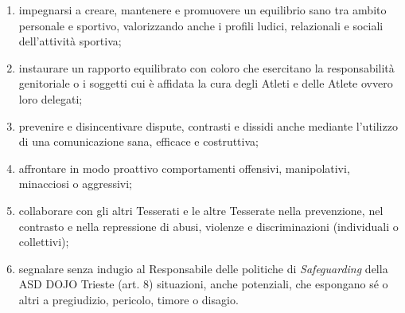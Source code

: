 \documentclass{djtsasddoc}
\begin{document}
\begin{enumerate}
\begin{enumerate}
			\item impegnarsi a creare, mantenere e promuovere un equilibrio sano tra ambito personale e 	sportivo, valorizzando anche i profili ludici, relazionali e sociali dell'attività sportiva;
			\item instaurare un rapporto equilibrato con coloro che esercitano la responsabilità genitoriale o i	soggetti cui è affidata la cura degli Atleti e delle Atlete ovvero loro delegati;
			\item prevenire e disincentivare dispute, contrasti e dissidi anche mediante l'utilizzo di una	comunicazione sana, efficace e costruttiva;
			\item affrontare in modo proattivo comportamenti offensivi, manipolativi, minacciosi o aggressivi;
			\item collaborare con gli altri Tesserati e le altre Tesserate nella prevenzione, nel contrasto e nella	repressione di abusi, violenze e discriminazioni (individuali o collettivi);
			\item segnalare senza indugio al Responsabile delle politiche di \textit{Safeguarding} della ASD DOJO Trieste (art. 8) situazioni, anche potenziali, che espongano sé o altri a pregiudizio, pericolo, timore o disagio.
		\end{enumerate}
	\end{enumerate}
	
\end{document}
